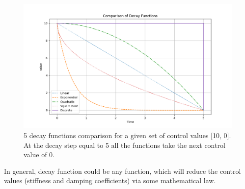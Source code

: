 \begin{figure}[ht]
	\centering
	\includegraphics[width=13cm]{Figures/CL_decay_types_comparison.png}
	\caption{5 decay functions comparison for a given set of control values [10, 0]. At the decay step equal to 5 all the functions take the next control value of 0.}
	\label{fig: decay functions}
\end{figure}

In general, decay function could be any function, which will reduce the control values (stiffness and damping coefficients) via some mathematical law.